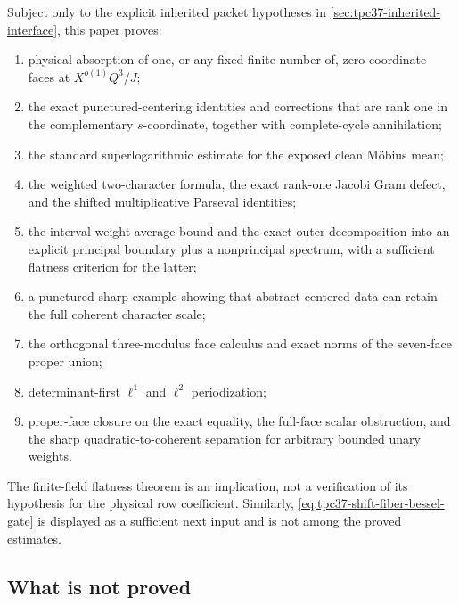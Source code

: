 Subject only to the explicit inherited packet hypotheses in
\cref{sec:tpc37-inherited-interface}, this paper proves:
\begin{enumerate}[label=(\roman*)]
 \item physical absorption of one, or any fixed finite number of,
 zero-coordinate faces at \(X^{o(1)}Q^3/J\);
 \item the exact punctured-centering identities and corrections that are
 rank one in the complementary \(s\)-coordinate,
 together with complete-cycle annihilation;
 \item the standard superlogarithmic estimate for the exposed clean
 M\"obius mean;
 \item the weighted two-character formula, the exact rank-one Jacobi Gram
 defect, and the shifted multiplicative Parseval identities;
 \item the interval-weight average bound and the exact outer decomposition
 into an explicit principal boundary plus a nonprincipal spectrum, with a
 sufficient flatness criterion for the latter;
 \item a punctured sharp example showing that abstract centered data can
 retain the full coherent character scale;
 \item the orthogonal three-modulus face calculus and exact norms of the
 seven-face proper union;
 \item determinant-first \(\ell^1\) and \(\ell^2\) periodization;
 \item proper-face closure on the exact equality, the full-face scalar
 obstruction, and the sharp quadratic-to-coherent separation for
 arbitrary bounded unary weights.
\end{enumerate}
The finite-field flatness theorem is an implication, not a verification
of its hypothesis for the physical row coefficient.  Similarly,
\eqref{eq:tpc37-shift-fiber-bessel-gate} is displayed as a sufficient
next input and is not among the proved estimates.

\subsection{What is not proved}

